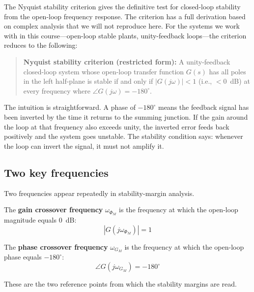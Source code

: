 \documentclass[../../book.tex]{subfiles}
\begin{document}
The Nyquist stability criterion gives the definitive test for closed-loop
stability from the open-loop frequency response.  The criterion has a full
derivation based on complex analysis that we will not reproduce here.  For the
systems we work with in this course---open-loop stable plants, unity-feedback
loops---the criterion reduces to the following:

\begin{quote}
\textbf{Nyquist stability criterion (restricted form):} A unity-feedback
closed-loop system whose open-loop transfer function $G(s)$ has all poles in
the left half-plane is stable if and only if
$|G(j\omega)| < 1$ (i.e., $< 0$~dB) at every frequency where
$\angle G(j\omega) = -180^\circ$.
\end{quote}

The intuition is straightforward.  A phase of $-180^\circ$ means the feedback
signal has been inverted by the time it returns to the summing junction.  If
the gain around the loop at that frequency also exceeds unity, the inverted
error feeds back positively and the system goes unstable.  The stability
condition says: whenever the loop can invert the signal, it must not amplify
it.

\subsection{Two key frequencies}
\label{sec:crossover_freqs}

Two frequencies appear repeatedly in stability-margin analysis.

The \textbf{gain crossover frequency} $\omega_{\Phi_M}$ is the frequency at
which the open-loop magnitude equals 0~dB:
\begin{equation}
  |G(j\omega_{\Phi_M})| = 1
  \label{eq:gc_freq}
\end{equation}

The \textbf{phase crossover frequency} $\omega_{G_M}$ is the frequency at
which the open-loop phase equals $-180^\circ$:
\begin{equation}
  \angle G(j\omega_{G_M}) = -180^\circ
  \label{eq:pc_freq}
\end{equation}

These are the two reference points from which the stability margins are read.

\end{document}
